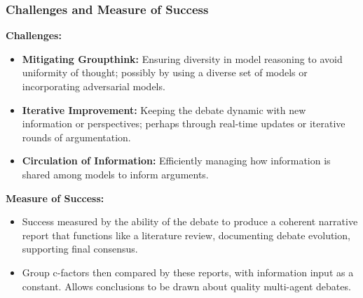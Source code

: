 \documentclass{beamer}
\begin{document}
\logo{} %

\begin{frame}
\frametitle{Challenges and Measure of Success}
\small %

\textbf{Challenges:}
\begin{itemize}
    \item \textbf{Mitigating Groupthink:} Ensuring diversity in model reasoning to avoid uniformity of thought; possibly by using a diverse set of models or incorporating adversarial models.
    \item \textbf{Iterative Improvement:} Keeping the debate dynamic with new information or perspectives; perhaps through real-time updates or iterative rounds of argumentation.
    \item \textbf{Circulation of Information:} Efficiently managing how information is shared among models to inform arguments.
\end{itemize}

\textbf{Measure of Success:}
\begin{itemize}
    \item Success measured by the ability of the debate to produce a coherent narrative report that functions like a literature review, documenting debate evolution, supporting final consensus.
    \item Group c-factors then compared by these reports, with information input as a constant. Allows conclusions to be drawn about quality multi-agent debates.
\end{itemize}

\end{frame}
\end{document}

